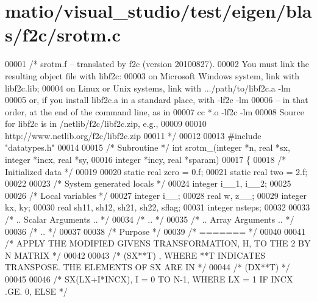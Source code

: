 \hypertarget{matio_2visual__studio_2test_2eigen_2blas_2f2c_2srotm_8c_source}{}\section{matio/visual\+\_\+studio/test/eigen/blas/f2c/srotm.c}
\label{matio_2visual__studio_2test_2eigen_2blas_2f2c_2srotm_8c_source}

\begin{DoxyCode}
00001 \textcolor{comment}{/* srotm.f -- translated by f2c (version 20100827).}
00002 \textcolor{comment}{   You must link the resulting object file with libf2c:}
00003 \textcolor{comment}{    on Microsoft Windows system, link with libf2c.lib;}
00004 \textcolor{comment}{    on Linux or Unix systems, link with .../path/to/libf2c.a -lm}
00005 \textcolor{comment}{    or, if you install libf2c.a in a standard place, with -lf2c -lm}
00006 \textcolor{comment}{    -- in that order, at the end of the command line, as in}
00007 \textcolor{comment}{        cc *.o -lf2c -lm}
00008 \textcolor{comment}{    Source for libf2c is in /netlib/f2c/libf2c.zip, e.g.,}
00009 \textcolor{comment}{}
00010 \textcolor{comment}{        http://www.netlib.org/f2c/libf2c.zip}
00011 \textcolor{comment}{*/}
00012 
00013 \textcolor{preprocessor}{#include "datatypes.h"}
00014 
00015 \textcolor{comment}{/* Subroutine */} \textcolor{keywordtype}{int} srotm\_(integer *n, real *sx, integer *incx, real *sy, 
00016     integer *incy, real *sparam)
00017 \{
00018     \textcolor{comment}{/* Initialized data */}
00019 
00020     \textcolor{keyword}{static} real zero = 0.f;
00021     \textcolor{keyword}{static} real two = 2.f;
00022 
00023     \textcolor{comment}{/* System generated locals */}
00024     integer i\_\_1, i\_\_2;
00025 
00026     \textcolor{comment}{/* Local variables */}
00027     integer i\_\_;
00028     real w, z\_\_;
00029     integer kx, ky;
00030     real sh11, sh12, sh21, sh22, sflag;
00031     integer nsteps;
00032 
00033 \textcolor{comment}{/*     .. Scalar Arguments .. */}
00034 \textcolor{comment}{/*     .. */}
00035 \textcolor{comment}{/*     .. Array Arguments .. */}
00036 \textcolor{comment}{/*     .. */}
00037 
00038 \textcolor{comment}{/*  Purpose */}
00039 \textcolor{comment}{/*  ======= */}
00040 
00041 \textcolor{comment}{/*     APPLY THE MODIFIED GIVENS TRANSFORMATION, H, TO THE 2 BY N MATRIX */}
00042 
00043 \textcolor{comment}{/*     (SX**T) , WHERE **T INDICATES TRANSPOSE. THE ELEMENTS OF SX ARE IN */}
00044 \textcolor{comment}{/*     (DX**T) */}
00045 
00046 \textcolor{comment}{/*     SX(LX+I*INCX), I = 0 TO N-1, WHERE LX = 1 IF INCX .GE. 0, ELSE */}

\end{DoxyCode}
